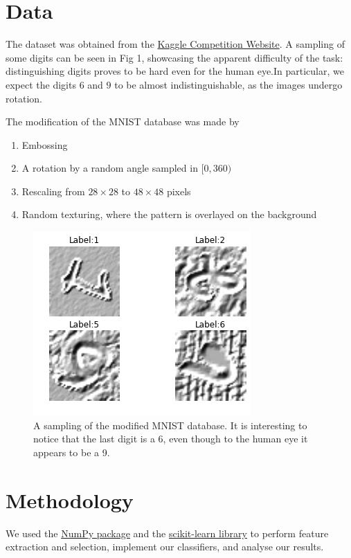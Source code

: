 \documentclass[conference]{IEEEtran}
\begin{document}
\section{Data}

The dataset was obtained from the \href{https://inclass.kaggle.com/c/modified-digits}{Kaggle Competition Website}. A sampling of some digits can be seen in Fig 1, showcasing the apparent difficulty of the task: distinguishing digits proves to be hard even for the human eye.In particular, we expect the digits $6$ and $9$ to be almost indistinguishable, as the images undergo rotation.

The modification of the MNIST \cite{MNIST_Original} database was made by 
\begin{enumerate}
\item Embossing 
\item A rotation by a random angle sampled in $[0,360)$
\item Rescaling from $28\times28$ to $48\times48$ pixels
\item Random texturing, where the pattern is overlayed on the background
\end{enumerate}

\begin{figure}[h]
		\label{MNISTSample1}
	\centering
	\includegraphics[scale=0.50]{sample_of_images.png}
	\caption{A sampling of the modified MNIST database. It is interesting to notice that the last digit is a 6, even though to the human eye it appears to be a 9.}
\end{figure}

\section{Methodology}

We used the \href{http://www.numpy.org/}{NumPy package} and the \href{http://www.scikit-learn.org/}{scikit-learn library} to perform feature extraction and selection, implement our classifiers, and analyse our results. 
\end{document}
